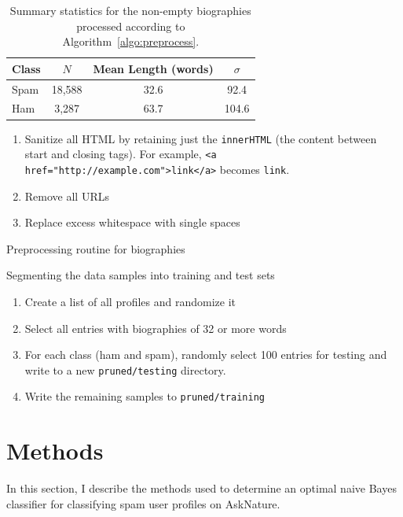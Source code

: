 \documentclass[draft,10pt]{article}
\begin{document}
\begin{table}[t]
  \centering
  \caption{Summary statistics for the non-empty biographies processed
    according to Algorithm~\ref{algo:preprocess}.}
  \label{table:corpus-stats}
  \begin{tabular}{lccc}
    \toprule
    Class & $N$ & Mean Length (words) & $\sigma$\\ \midrule
    Spam  & 18,588 & 32.6 & 92.4 \\
    Ham   & 3,287  & 63.7 & 104.6 \\
    \bottomrule
  \end{tabular}
\end{table}

\begin{algorithm}[b]
  \begin{enumerate}
  \item Sanitize all HTML by retaining just the \texttt{innerHTML} (the
    content between start and closing tags). For example, \texttt{<a
      href="http://example.com">link</a>} becomes \texttt{link}.
  \item Remove all URLs
  \item Replace excess whitespace with single spaces
  \end{enumerate}
  \caption{Preprocessing routine for biographies}
  \label{algo:preprocess}
\end{algorithm}

\begin{algorithm}[t]
  \caption{Segmenting the data samples into training and test sets}
  \label{algo:segment}
  \begin{enumerate}
  \item Create a list of all profiles and randomize it
  \item Select all entries with biographies of 32 or more words
  \item For each class (ham and spam), randomly select 100 entries for testing
    and write to a new \texttt{pruned/testing} directory.
  \item Write the remaining samples to \texttt{pruned/training}
  \end{enumerate}
\end{algorithm}


\section{Methods}

In this section, I describe the methods used to determine an optimal naive
Bayes classifier for classifying spam user profiles on AskNature.
\end{document}
